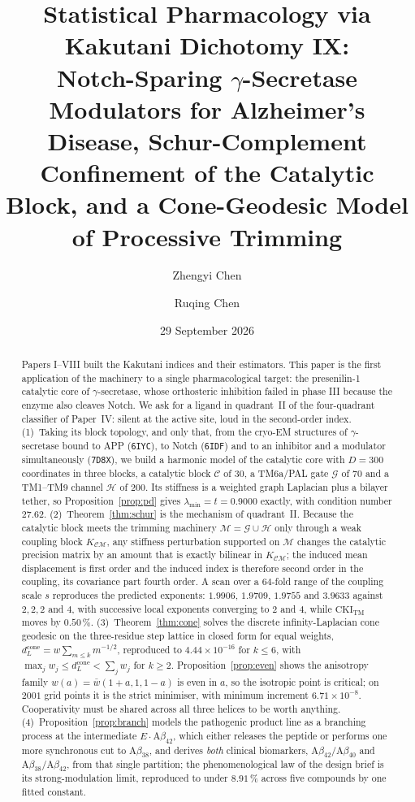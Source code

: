 \documentclass[11pt,reqno]{amsart}
\title[Statistical pharmacology via Kakutani dichotomy IX]{Statistical Pharmacology via Kakutani Dichotomy IX:\\ Notch-Sparing $\gamma$-Secretase Modulators for Alzheimer's Disease, Schur-Complement Confinement of the Catalytic Block, and a Cone-Geodesic Model of Processive Trimming}
\author[Z. Chen]{Zhengyi Chen}
\author[R. Chen]{Ruqing Chen}
\date{29 September 2026}
\theoremstyle{plain}
\theoremstyle{definition}
\theoremstyle{remark}
\numberwithin{equation}{section}
\newcommand{\CKI}{\mathrm{CKI}}
\newcommand{\CKItm}{\CKI_{\mathrm{TM}}}
\newcommand{\dcone}{d_L^{\mathrm{cone}}}
\newcommand{\CC}{\mathcal{C}}
\newcommand{\GG}{\mathcal{G}}
\newcommand{\HH}{\mathcal{H}}
\newcommand{\MM}{\mathcal{M}}
\newcommand{\Ab}{\mathrm{A}\beta}
\begin{document}
\begin{abstract}
Papers I--VIII built the Kakutani indices and their estimators. This paper is the first application of the machinery to a single pharmacological target: the presenilin-1 catalytic core of $\gamma$-secretase, whose orthosteric inhibition failed in phase III because the enzyme also cleaves Notch. We ask for a ligand in quadrant~II of the four-quadrant classifier of Paper~IV: silent at the active site, loud in the second-order index.
(1)~Taking its block topology, and only that, from the cryo-EM structures of $\gamma$-secretase bound to APP (\texttt{6IYC}), to Notch (\texttt{6IDF}) and to an inhibitor and a modulator simultaneously (\texttt{7D8X}), we build a harmonic model of the catalytic core with $D=300$ coordinates in three blocks, a catalytic block $\CC$ of $30$, a TM6a/PAL gate $\GG$ of $70$ and a TM1--TM9 channel $\HH$ of $200$. Its stiffness is a weighted graph Laplacian plus a bilayer tether, so Proposition~\ref{prop:pd} gives $\lambda_{\min}=t=0.9000$ exactly, with condition number $27.62$.
(2)~Theorem~\ref{thm:schur} is the mechanism of quadrant~II. Because the catalytic block meets the trimming machinery $\MM=\GG\cup\HH$ only through a weak coupling block $K_{\CC\MM}$, any stiffness perturbation supported on $\MM$ changes the catalytic precision matrix by an amount that is exactly bilinear in $K_{\CC\MM}$; the induced mean displacement is first order and the induced index is therefore second order in the coupling, its covariance part fourth order. A scan over a $64$-fold range of the coupling scale $s$ reproduces the predicted exponents: $1.9906$, $1.9709$, $1.9755$ and $3.9633$ against $2,2,2$ and $4$, with successive local exponents converging to $2$ and $4$, while $\CKItm$ moves by $0.50\,\%$.
(3)~Theorem~\ref{thm:cone} solves the discrete infinity-Laplacian cone geodesic on the three-residue step lattice in closed form for equal weights, $\dcone=w\sum_{m\le k}m^{-1/2}$, reproduced to $4.44\times10^{-16}$ for $k\le6$, with $\max_j w_j\le\dcone<\sum_j w_j$ for $k\ge2$. Proposition~\ref{prop:even} shows the anisotropy family $w(a)=\bar w(1+a,1,1-a)$ is even in $a$, so the isotropic point is critical; on $2001$ grid points it is the strict minimiser, with minimum increment $6.71\times10^{-8}$. Cooperativity must be shared across all three helices to be worth anything.
(4)~Proposition~\ref{prop:branch} models the pathogenic product line as a branching process at the intermediate $E\cdot\Ab_{42}$, which either releases the peptide or performs one more synchronous cut to $\Ab_{38}$, and derives \emph{both} clinical biomarkers, $\Ab_{42}/\Ab_{40}$ and $\Ab_{38}/\Ab_{42}$, from that single partition; the phenomenological law of the design brief is its strong-modulation limit, reproduced to under $8.91\,\%$ across five compounds by one fitted constant.

\end{abstract}
\end{document}
